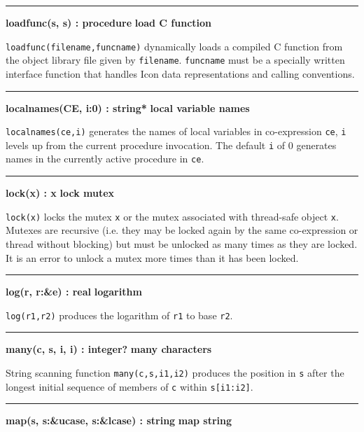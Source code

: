 \bigskip\hrule\vspace{0.1cm}
\noindent
{\bf loadfunc(s, s) : procedure } \hfill {\bf load C function}

\noindent
{}\texttt{loadfunc(filename,funcname)} dynamically
loads a compiled C function from the object library file given by
\texttt{filename}. \texttt{funcname} must be a specially written
interface function that handles Icon data representations and calling
conventions.

\bigskip\hrule\vspace{0.1cm}
\noindent
{\bf localnames(CE, i:0) : string* } \hfill {\bf local variable names}

\noindent
{}\texttt{localnames(ce,i)} generates the
names of local variables in co-expression \texttt{ce}, \texttt{i}
levels up from the current procedure invocation. The default \texttt{i} of 0
generates names in the currently active procedure in \texttt{ce}.

\bigskip\hrule\vspace{0.1cm}
\noindent
{\bf lock(x) : x } \hfill {\bf lock mutex}

\noindent
{}\texttt{lock(x)} locks the mutex \texttt{x} or the mutex
associated with thread-safe object \texttt{x}.
Mutexes are recursive (i.e. they may be locked again by the same co-expression
or thread without blocking) but must be unlocked as many times as they are
locked. It is an error to unlock a mutex more times than it has been locked.

\bigskip\hrule\vspace{0.1cm}
\noindent
{\bf log(r, r:\&e) : real } \hfill {\bf logarithm}

\noindent
{}\texttt{log(r1,r2)} produces the logarithm of
\texttt{r1} to base \texttt{r2}.

\bigskip\hrule\vspace{0.1cm}
\noindent
{\bf many(c, s, i, i) : integer? } \hfill {\bf many characters}

\noindent
{}String scanning function \texttt{many(c,s,i1,i2)} produces
the position in \texttt{s} after the longest initial sequence of
members of \texttt{c} within \texttt{s[i1:i2]}.

\bigskip\hrule\vspace{0.1cm}
\noindent
{\bf map(s, s:\&ucase, s:\&lcase) : string } \hfill {\bf map string}

